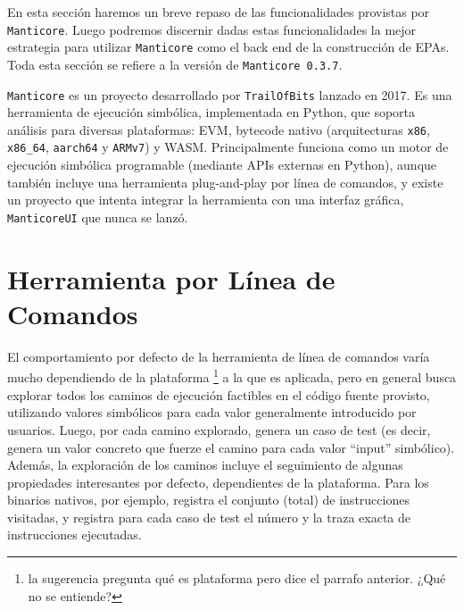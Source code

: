 En esta sección haremos un breve repaso de las funcionalidades provistas por \texttt{Manticore}.
Luego podremos discernir dadas estas funcionalidades la mejor estrategia para utilizar \texttt{Manticore} como el back end de la construcción de EPAs.
Toda esta sección se refiere a la versión de \texttt{Manticore 0.3.7}.

\texttt{Manticore} es un proyecto desarrollado por \texttt{TrailOfBits} lanzado en 2017.
Es una herramienta de ejecución simbólica, implementada en Python, que soporta análisis para diversas plataformas: EVM, bytecode nativo (arquitecturas \texttt{x86}, \texttt{x86\_64}, \texttt{aarch64} y \texttt{ARMv7}) y WASM.
Principalmente funciona como un motor de ejecución simbólica programable (mediante APIs externas en Python), aunque también incluye una herramienta plug-and-play por línea de comandos, y existe un proyecto que intenta integrar la herramienta con una interfaz gráfica, \texttt{ManticoreUI} \cite{manticoreUI} que nunca se lanzó.

\section{Herramienta por Línea de Comandos}

El comportamiento por defecto de la herramienta de línea de comandos varía mucho dependiendo de la plataforma \footnote{la sugerencia pregunta qué es plataforma pero dice el parrafo anterior. ¿Qué no se entiende?} a la que es aplicada, pero en general busca explorar todos los caminos de ejecución factibles en el código fuente provisto, utilizando valores simbólicos para cada valor generalmente introducido por usuarios.
Luego, por cada camino explorado, genera un caso de test (es decir, genera un valor concreto que fuerze el camino para cada valor ``input'' simbólico).
Además, la exploración de los caminos incluye el seguimiento de algunas propiedades interesantes por defecto, dependientes de la plataforma.
Para los binarios nativos, por ejemplo, registra el conjunto (total) de instrucciones visitadas, y registra para cada caso de test el número y la traza exacta de instrucciones ejecutadas.

